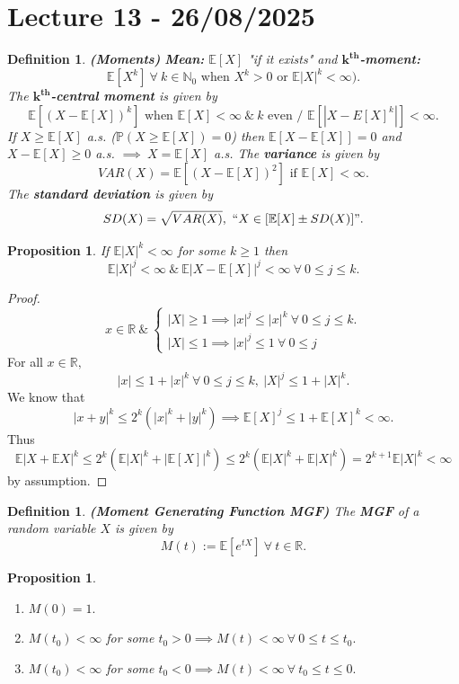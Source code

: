 \documentclass{article}
\newcommand{\1}{\mathds{1}}
\newcommand{\R}{\mathbb{R}}
\newcommand{\E}{\mathbb{E}}
\newcommand{\N}{\mathbb{N}}
\newcommand{\PB}{\mathbb{P}}
\newcommand{\lf}{\left}
\newcommand{\rg}{\right}
\newcommand{\tb}[1]{\lf[#1\rg]}
\newcommand{\card}[1]{\lf\vert #1\rg\vert}
\newcommand{\ar}{\ \&\ }
\newtheorem{proposition}[theorem]{Proposition}
\newtheorem{definition}[theorem]{Definition}
\begin{document}
\section{Lecture 13 - 26/08/2025}
\begin{definition}\textbf{(Moments)}
\textbf{Mean:} $\E[X]$ "if it exists" and \textbf{$\mathbf{k^{th}}$-moment:} $$\E[X^k]\ \forall\ k\in\N_0\text{ when }X^k>0\text{ or }\E\card{X}^k<\infty).$$ The \textbf{$\mathbf{k^{th}}$-central moment} is given by $$\E[(X-\E[X])^k]\text{ when }\E[X]<\infty\ar k\text{ even / }\E\tb{\card{X-E[X]^k}}<\infty.$$ If $X\geq \E[X]$ a.s. ($\PB(X\geq\E[X])=0$) then $\E[X-\E[X]]=0$ and $X-\E[X]\geq 0$ a.s. $\implies\ X=\E[X]$ a.s.
The \textbf{variance} is given by $$VAR(X)=\E[(X-\E[X])^2]\text{ if }\E[X]<\infty.$$ The \textbf{standard deviation} is given by $$SD(X)=\sqrt{VAR(X)},\ ``X\in[\E[X]\pm SD(X)]".$$
\end{definition}
\begin{proposition}
    If $\E\card{X}^k<\infty$ for some $k\geq 1$ then $$\E\card{X}^j<\infty\ar \E\card{X-\E[X]}^j<\infty\ \forall\ 0\leq j\leq k.$$
\end{proposition}
\begin{proof}
    $$x\in\R\ar \begin{cases} \card{X}\geq 1\implies \card{x}^j\leq\card{x}^k\ \forall\ 0\leq j\leq k.\\ \card{X}\leq 1\implies \card{x}^j\leq 1\ \forall\ 0\leq j\end{cases}$$ For all $x\in\R,$ $$\card{x}\leq 1+\card{x}^k\ \forall\ 0\leq j\leq k,\ \card{X}^j\leq 1+\card{X}^k.$$ We know that $$\card{x+y}^k\leq 2^k(\card{x}^k+\card{y}^k)\implies \E[X]^j\leq 1+\E[X]^k<\infty.$$ Thus $$\E\card{X+\E X}^k\leq 2^k(\E\card X^k+\card{\E [X]}^k)\leq 2^k(\E\card X^k+\E\card X^k)=2^{k+1}\E\card X^k<\infty$$ by assumption.
\end{proof}
\begin{definition}\textbf{(Moment Generating Function MGF)}
   The \textbf{MGF} of a random variable $X$ is given by $$M(t):=\E[e^{tX}]\ \forall\ t\in\R.$$
\end{definition}
\begin{proposition}
    \begin{enumerate}
        \item $M(0)=1.$
        \item $M(t_0)<\infty$ for some $t_0>0\implies M(t)<\infty\ \forall\ 0\leq t\leq t_0.$
        \item $M(t_0)<\infty$ for some $t_0<0\implies M(t)<\infty\ \forall\ t_0\leq t\leq 0.$
    \end{enumerate}
\end{proposition}
\end{document}
